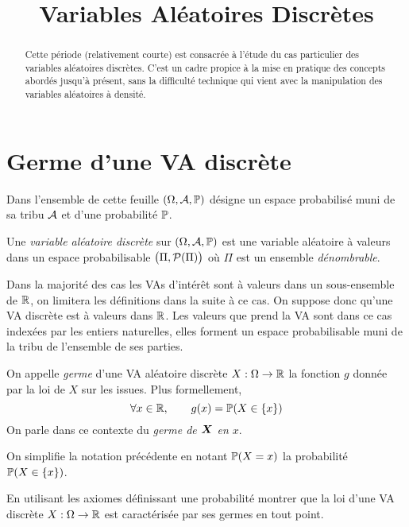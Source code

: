 \documentclass[11pt, a4paper]{article}
\title{%
  { \huge Variables Aléatoires Discrètes}%
}
\author{}
\date{}
\begin{document}
\maketitle\thispagestyle{fancy}

\begin{abstract}
  Cette période (relativement courte) est consacrée à l'étude du cas
  particulier des variables aléatoires discrètes. C'est un cadre
  propice à la mise en pratique des concepts abordés jusqu'à présent,
  sans la difficulté technique qui vient avec la manipulation des
  variables aléatoires à densité.
\end{abstract}

\tableofcontents

\section{Germe d'une VA discrète}
\label{sec:germeVAdiscrete}

Dans l'ensemble de cette feuille $(\Omega, \mathcal{A}, \operatorname{\mathbb{P}})$ désigne un
espace probabilisé muni de sa tribu $\mathcal{A}$ et d'une probabilité
$\operatorname{\mathbb{P}}$.
\begin{defn}
  Une \emph{variable aléatoire discrète} sur $(\Omega, \mathcal{A}, \operatorname{\mathbb{P}})$
  est une variable aléatoire à valeurs dans un espace probabilisable
  $\big(\Pi, \mathcal{P}(\Pi)\big)$ où $\Pi$ est un ensemble
  \textit{dénombrable}.
\end{defn}
\begin{rem}
  Dans la majorité des cas les VAs d'intérêt sont à valeurs dans un
  sous-ensemble de $\mathbb{R}$, on limitera les définitions dans la suite à
  ce cas. On suppose donc qu'une VA discrète est à valeurs dans $\mathbb{R}$.
  Les valeurs que prend la VA sont dans ce cas indexées par les
  entiers naturelles, elles forment un espace probabilisable muni de
  la tribu de l'ensemble de ses parties.
\end{rem}
On appelle \emph{germe} d'une VA aléatoire discrète
$X : \Omega \to \mathbb{R}$ la fonction $g$ donnée par la loi de $X$ sur les
issues. Plus formellement,
\[
  \forall x \in \mathbb{R}, \qquad g(x) = \operatorname{\mathbb{P}}(X \in \{x\})
\]
On parle dans ce contexte du \emph{germe de $\boldsymbol{X}$ en $x$}.
\begin{nota}
  On simplifie la notation précédente en notant $\operatorname{\mathbb{P}}(X = x)$ la
  probabilité $\operatorname{\mathbb{P}}(X \in \{x\})$.
\end{nota}
\begin{question}
  En utilisant les axiomes définissant une probabilité montrer que la
  loi d'une VA discrète $X : \Omega \to \mathbb{R}$ est caractérisée par ses
  germes en tout point.
\end{question}
\end{document}
